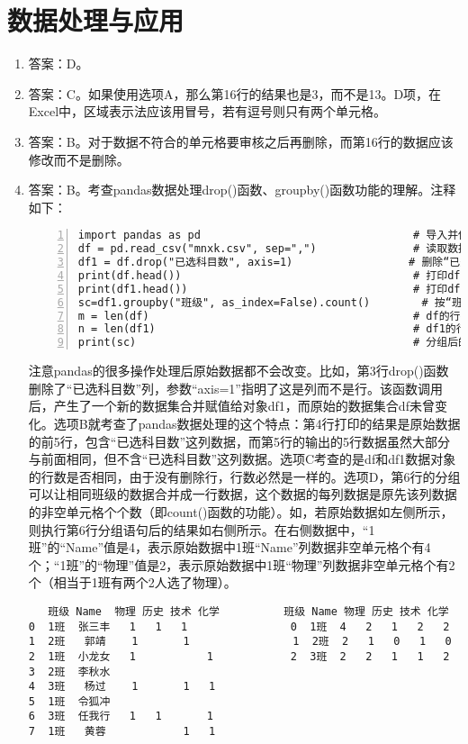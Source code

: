 \section{数据处理与应用}

\begin{enumerate}
\item 答案：D。

\item 答案：C。如果使用选项A，那么第16行的结果也是3，而不是13。D项，在Excel中，区域表示法应该用冒号，若有逗号则只有两个单元格。

\item 答案：B。对于数据不符合的单元格要审核之后再删除，而第16行的数据应该修改而不是删除。

\item 答案：B。考查pandas数据处理drop()函数、groupby()函数功能的理解。注释如下：
\begin{lstlisting}[numbers=left]
import pandas as pd									# 导入并使用pd作为别名
df = pd.read_csv("mnxk.csv", sep=",")				# 读取数据
df1 = df.drop("已选科目数", axis=1)				    # 删除“已选科目数”列
print(df.head())									# 打印df的前5行
print(df1.head())									# 打印df1的前5行
sc=df1.groupby("班级", as_index=False).count()	    # 按“班级”分组
m = len(df)											# df的行数
n = len(df1)										# df1的行数
print(sc)											# 分组后的数据
\end{lstlisting}
注意pandas的很多操作处理后原始数据都不会改变。比如，第3行drop()函数删除了“已选科目数”列，参数“axis=1”指明了这是列而不是行。该函数调用后，产生了一个新的数据集合并赋值给对象df1，而原始的数据集合df未曾变化。选项B就考查了pandas数据处理的这个特点：第4行打印的结果是原始数据的前5行，包含“已选科目数”这列数据，而第5行的输出的5行数据虽然大部分与前面相同，但不含“已选科目数”这列数据。选项C考查的是df和df1数据对象的行数是否相同，由于没有删除行，行数必然是一样的。选项D，第6行的分组可以让相同班级的数据合并成一行数据，这个数据的每列数据是原先该列数据的非空单元格个个数（即count()函数的功能）。如，若原始数据如左侧所示，则执行第6行分组语句后的结果如右侧所示。在右侧数据中，“1班”的“Name”值是4，表示原始数据中1班“Name”列数据非空单元格个有4个；“1班”的“物理”值是2，表示原始数据中1班“物理”列数据非空单元格个有2个（相当于1班有两个2人选了物理）。
\begin{lstlisting}
   班级 Name  物理 历史 技术 化学          班级 Name 物理 历史 技术 化学
0  1班  张三丰   1   1   1                0  1班  4   2   1   2   2
1  2班   郭靖    1       1                1  2班  2   1   0   1   0
2  1班  小龙女   1           1            2  3班  2   2   1   1   2
3  2班  李秋水                
4  3班   杨过    1       1   1
5  1班  令狐冲                
6  3班  任我行   1   1       1
7  1班   黄蓉            1   1
\end{lstlisting}


\end{enumerate}
